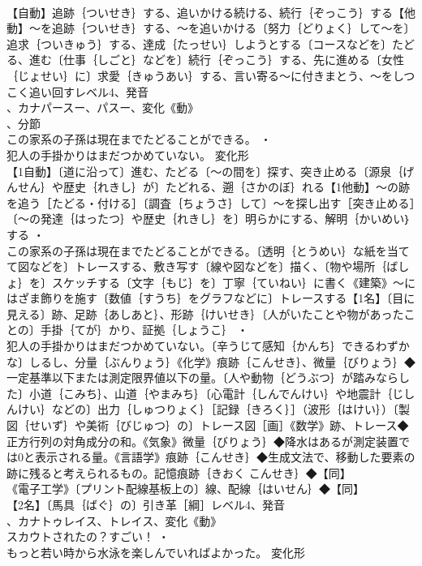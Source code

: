 \documentclass[8pt]{extreport}
\begin{document}
\begin{CJK}{UTF8}{min}
\\	【自動】追跡｛ついせき｝する、追いかける続ける、続行｛ぞっこう｝する【他動】～を追跡｛ついせき｝する、～を追いかける〔努力｛どりょく｝して～を〕追求｛ついきゅう｝する、達成｛たっせい｝しようとする〔コースなどを〕たどる、進む〔仕事｛しごと｝などを〕続行｛ぞっこう｝する、先に進める〔女性｛じょせい｝に〕求愛｛きゅうあい｝する、言い寄る～に付きまとう、～をしつこく追い回すレベル4、発音
\\	、カナパースー、パスー、変化《動》
\\	、分節
\\	この家系の子孫は現在までたどることができる。 ・
\\	犯人の手掛かりはまだつかめていない。	変化形 
\\	【1自動】〔道に沿って〕進む、たどる〔～の間を〕探す、突き止める〔源泉｛げんせん｝や歴史｛れきし｝が〕たどれる、遡｛さかのぼ｝れる【1他動】～の跡を追う［たどる・付ける］〔調査｛ちょうさ｝して〕～を探し出す［突き止める］〔～の発達｛はったつ｝や歴史｛れきし｝を〕明らかにする、解明｛かいめい｝する ・
\\	この家系の子孫は現在までたどることができる。〔透明｛とうめい｝な紙を当てて図などを〕トレースする、敷き写す〔線や図などを〕描く、〔物や場所｛ばしょ｝を〕スケッチする〔文字｛もじ｝を〕丁寧｛ていねい｝に書く《建築》～にはざま飾りを施す〔数値｛すうち｝をグラフなどに〕トレースする【1名】〔目に見える〕跡、足跡｛あしあと｝、形跡｛けいせき｝〔人がいたことや物があったことの〕手掛｛てが｝かり、証拠｛しょうこ｝ ・
\\	犯人の手掛かりはまだつかめていない。〔辛うじて感知｛かんち｝できるわずかな〕しるし、分量｛ぶんりょう｝《化学》痕跡｛こんせき｝、微量｛びりょう｝◆一定基準以下または測定限界値以下の量。〔人や動物｛どうぶつ｝が踏みならした〕小道｛こみち｝、山道｛やまみち｝〔心電計｛しんでんけい｝や地震計｛じしんけい｝などの〕出力｛しゅつりょく｝［記録｛きろく｝］（波形｛はけい｝）〔製図｛せいず｝や美術｛びじゅつ｝の〕トレース図［画］《数学》跡、トレース◆正方行列の対角成分の和。《気象》微量｛びりょう｝◆降水はあるが測定装置では0と表示される量。《言語学》痕跡｛こんせき｝◆生成文法で、移動した要素の跡に残ると考えられるもの。記憶痕跡｛きおく こんせき｝◆【同】
\\	《電子工学》〔プリント配線基板上の〕線、配線｛はいせん｝◆【同】
\\	【2名】〔馬具｛ばぐ｝の〕引き革［綱］レベル4、発音
\\	、カナトゥレイス、トレイス、変化《動》
\\	スカウトされたの？すごい！ ・
\\	もっと若い時から水泳を楽しんでいればよかった。	変化形 

\end{CJK}
\end{document}
